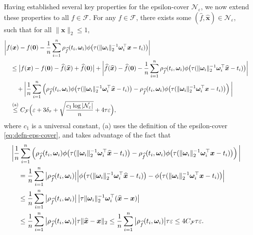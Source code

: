 \documentclass[english]{article}
\begin{document}
Having established several key properties for the epsilon-cover $\mathcal{N}_{\varepsilon}$, we now extend these properties to all $f\in \mathcal{F}$. 
For any $f \in \mathcal{F}$, there exists some $(\widehat{f}, \widehat{\bm x}) \in \mathcal{N}_{\varepsilon}$, such that for all $\|{\bm x}\|_2\le 1$,
\begin{align*}
&\bigg|f({\bm x})  - f(\bm{0}) -  \frac{1}{n}\sum_{i = 1}^n\rho_{\widehat{f}}(t_i, \bm{\omega}_i)\phi\big(\tau(\|\bm{\omega}_i\|_2^{-1}\bm{\omega}_i^{\top}{\bm x} - t_i)\big)\bigg|\notag\\
&\quad\le \big|f({\bm x}) - f({\bm 0}) - \widehat{f}(\widehat{\bm x}) + \widehat{f}({\bm 0}) \big| + \bigg|\widehat{f}(\widehat{\bm x}) - \widehat{f}(\bm{0}) -  \frac{1}{n}\sum_{i = 1}^n\rho_{\widehat{f}}(t_i, \bm{\omega}_i)\phi\big(\tau(\|\bm{\omega}_i\|_2^{-1}\bm{\omega}_i^{\top}\widehat{\bm x} - t_i)\big)\bigg|\notag\\
&\quad\quad + \bigg|\frac{1}{n}\sum_{i = 1}^n\left(\rho_{\widehat{f}}(t_i, \bm{\omega}_i)\phi\big(\tau(\|\bm{\omega}_i\|_2^{-1}\bm{\omega}_i^{\top}\widehat{\bm x} - t_i)\big)-\rho_{\widehat{f}}(t_i, \bm{\omega}_i)\phi\big(\tau(\|\bm{\omega}_i\|_2^{-1}\bm{\omega}_i^{\top}{\bm x} - t_i)\big)\right)\bigg|\notag\\
&\quad\overset{\text{(a)}}{\le} C_{\mathcal{F}}\Big(\varepsilon + 3\delta_{\tau} + \sqrt{\frac{c_1\log|\mathcal{N}_{\varepsilon}|}{n}} + 4\tau\varepsilon\Big),
\end{align*}
%
where $c_1$ is a universal constant, (a) uses the definition of the epsilon-cover \eqref{eq:defn-eps-cover}, and  
takes advantage of the fact that 
\begin{align*}
& \bigg|\frac{1}{n}\sum_{i = 1}^n\left(\rho_{\widehat{f}}(t_i, \bm{\omega}_i)\phi\big(\tau(\|\bm{\omega}_i\|_2^{-1}\bm{\omega}_i^{\top}\widehat{\bm x} - t_i)\big)-\rho_{\widehat{f}}( t_i, \bm{\omega}_i)\phi\big(\tau(\|\bm{\omega}_i\|_2^{-1}\bm{\omega}_i^{\top}{\bm x} - t_i)\big)\right)\bigg|\notag\\
&\quad= \frac{1}{n}\sum_{i = 1}^n\big|\rho_{\widehat{f}}(t_i, \bm{\omega}_i)\big|\Big|\phi\big(\tau(\|\bm{\omega}_i\|_2^{-1}\bm{\omega}_i^{\top}\widehat{\bm x} - t_i)\big)-\phi\big(\tau(\|\bm{\omega}_i\|_2^{-1}\bm{\omega}_i^{\top}{\bm x} - t_i)\big)\Big|\notag\\
&\quad\le \frac{1}{n}\sum_{i = 1}^n\big|\rho_{\widehat{f}}(t_i, \bm{\omega}_i)\big|\left|\tau\|\bm{\omega}_i\|_2^{-1}\bm{\omega}_i^{\top}(\widehat{\bm x}- {\bm x})\right|\notag\\
&\quad\le \frac{1}{n}\sum_{i = 1}^n\big|\rho_{\widehat{f}}(t_i, \bm{\omega}_i)\big|\tau\|\widehat{\bm x}- {\bm x}\|_2\le \frac{1}{n}\sum_{i = 1}^n\big|\rho_{\widehat{f}}(t_i, \bm{\omega}_i)\big|\tau \varepsilon\le 4C_{\mathcal{F}}\tau\varepsilon.
\end{align*}
\end{document}
